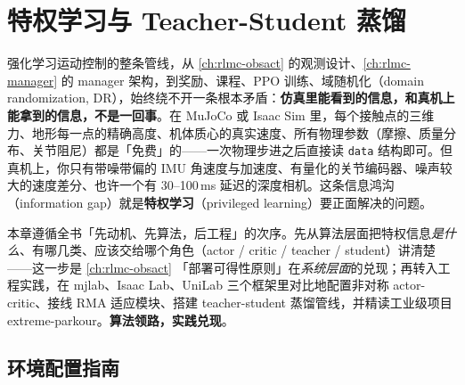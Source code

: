 \chapter{特权学习与 Teacher-Student 蒸馏}\label{ch:rlmc-privileged}


强化学习运动控制的整条管线，从 \cref{ch:rlmc-obsact} 的观测设计、\cref{ch:rlmc-manager} 的 manager 架构，到奖励、课程、PPO 训练、域随机化（domain randomization, DR），始终绕不开一条根本矛盾：\textbf{仿真里能看到的信息，和真机上能拿到的信息，不是一回事}。在 MuJoCo 或 Isaac Sim 里，每个接触点的三维力、地形每一点的精确高度、机体质心的真实速度、所有物理参数（摩擦、质量分布、关节阻尼）都是「免费」的——一次物理步进之后直接读 \verb|data| 结构即可。但真机上，你只有带噪带偏的 IMU 角速度与加速度、有量化的关节编码器、噪声较大的速度差分、也许一个有 30--100\,ms 延迟的深度相机。这条信息鸿沟（information gap）就是\textbf{特权学习}（privileged learning）要正面解决的问题。

本章遵循全书「先动机、先算法，后工程」的次序。先从算法层面把特权信息\emph{是什么}、有哪几类、应该交给哪个角色（actor / critic / teacher / student）讲清楚——这一步是 \cref{ch:rlmc-obsact} 「部署可得性原则」在\emph{系统层面}的兑现；再转入工程实践，在 mjlab、Isaac Lab、UniLab 三个框架里对比地配置非对称 actor-critic、接线 RMA 适应模块、搭建 teacher-student 蒸馏管线，并精读工业级项目 extreme-parkour。\textbf{算法领路，实践兑现}。

\section*{环境配置指南}
\label{sec:rlmc-priv-setup}


